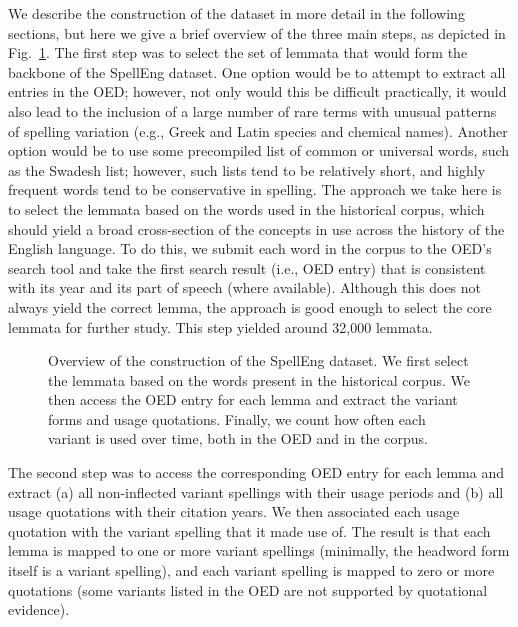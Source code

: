 \documentclass[doc,biblatex]{apa7}
\begin{document}
We describe the construction of the dataset in more detail in the following sections, but here we give a brief overview of the three main steps, as depicted in Fig.~\ref{pipeline}. The first step was to select the set of lemmata that would form the backbone of the SpellEng dataset. One option would be to attempt to extract all entries in the OED; however, not only would this be difficult practically, it would also lead to the inclusion of a large number of rare terms with unusual patterns of spelling variation (e.g., Greek and Latin species and chemical names). Another option would be to use some precompiled list of common or universal words, such as the Swadesh list; however, such lists tend to be relatively short, and highly frequent words tend to be conservative in spelling. The approach we take here is to select the lemmata based on the words used in the historical corpus, which should yield a broad cross-section of the concepts in use across the history of the English language. To do this, we submit each word in the corpus to the OED's search tool and take the first search result (i.e., OED entry) that is consistent with its year and its part of speech (where available). Although this does not always yield the correct lemma, the approach is good enough to select the core lemmata for further study. This step yielded around 32,000 lemmata.

	\begin{figure}
	\vspace*{2pt}
	\caption{Overview of the construction of the SpellEng dataset. We first select the lemmata based on the words present in the historical corpus. We then access the OED entry for each lemma and extract the variant forms and usage quotations. Finally, we count how often each variant is used over time, both in the OED and in the corpus.}
	\label{pipeline}
	\end{figure}

The second step was to access the corresponding OED entry for each lemma and extract (a) all non-inflected variant spellings with their usage periods and (b) all usage quotations with their citation years. We then associated each usage quotation with the variant spelling that it made use of. The result is that each lemma is mapped to one or more variant spellings (minimally, the headword form itself is a variant spelling), and each variant spelling is mapped to zero or more quotations (some variants listed in the OED are not supported by quotational evidence).
\end{document}
